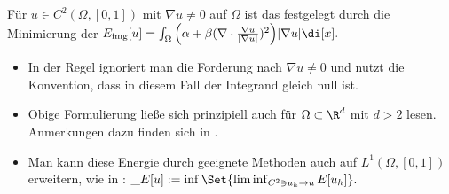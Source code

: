 \documentclass{mythesis}
\begin{document}
\begin{definition}
    Für $u \in C^2(\Omega, [0,1])$ mit $\nabla u \neq 0$ auf $\Omega$ ist das  festgelegt durch die Minimierung der 
    \begin{math}
	\Eimg[u] = \int_\Omega \Big(\alpha + \beta (\nabla \cdot \frac{\nabla u}{|\nabla u|})^2\Big)|\nabla u| \di[x].
    \end{math}
    \begin{note}
	\begin{itemize}
	    \item
		In der Regel ignoriert man die Forderung nach $\nabla u \neq 0$ und nutzt die Konvention, dass in diesem Fall der Integrand gleich null ist.
	    \item
		Obige Formulierung ließe sich prinzipiell auch für $\Omega \subset \R^d$ mit $d > 2$ lesen.
		Anmerkungen dazu finden sich in \cite{ambrosio2003direct}.
	    \item
		Man kann diese Energie durch geeignete Methoden auch auf $L^1(\Omega, [0,1])$ erweitern, wie in \cite{ambrosio2003direct}:
		\begin{math}
		    \_E[u] := \inf \Set{ \liminf_{C^2 \ni u_h \to u} E[u_h] }.
		\end{math}
	\end{itemize}
    \end{note}
\end{definition}
\end{document}
